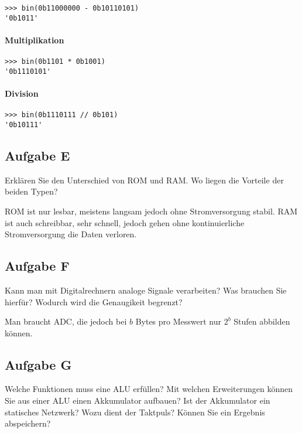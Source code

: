 \begin{verbatim}
>>> bin(0b11000000 - 0b10110101)
'0b1011'
\end{verbatim}

\paragraph{Multiplikation}

\begin{verbatim}
>>> bin(0b1101 * 0b1001)
'0b1110101'
\end{verbatim}

\paragraph{Division}

\begin{verbatim}
>>> bin(0b1110111 // 0b101)
'0b10111'
\end{verbatim}

\subsection{Aufgabe E}

\begin{problem}
	Erklären Sie den Unterschied von ROM und RAM. Wo liegen die Vorteile der
	beiden Typen?
\end{problem}

ROM ist nur lesbar, meistens langsam jedoch ohne Stromversorgung stabil. RAM
ist auch schreibbar, sehr schnell, jedoch gehen ohne kontinuierliche
Stromversorgung die Daten verloren.

\subsection{Aufgabe F}

\begin{problem}
	Kann man mit Digitalrechnern analoge Signale verarbeiten? Was brauchen Sie
	hierfür? Wodurch wird die Genaugikeit begrenzt?
\end{problem}

Man braucht ADC, die jedoch bei $b$ Bytes pro Messwert nur $2^b$ Stufen
abbilden können.

\subsection{Aufgabe G}

\begin{problem}
	Welche Funktionen muss eine ALU erfüllen? Mit welchen Erweiterungen können
	Sie aus einer ALU einen Akkumulator aufbauen? Ist der Akkumulator ein
	statisches Netzwerk? Wozu dient der Taktpuls? Können Sie ein Ergebnis
	abspeichern?
\end{problem}

